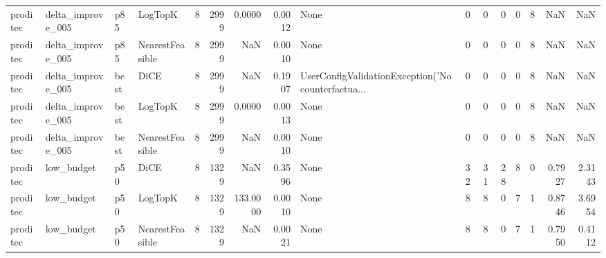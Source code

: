 \begin{tabular}{llllrrrrlrrrrrrr}
proditec &    delta\_improve\_005 &    p85 &         LogTopK &            8 &                 2999 &                   0.0000 &      0.0012 &                                               None &      0 &            0 &        0 &              0 &          8 &                NaN &            NaN \\
proditec &    delta\_improve\_005 &    p85 & NearestFeasible &            8 &                 2999 &                      NaN &      0.0010 &                                               None &      0 &            0 &        0 &              0 &          8 &                NaN &            NaN \\
proditec &    delta\_improve\_005 &   best &            DiCE &            8 &                 2999 &                      NaN &      0.1907 & UserConfigValidationException('No counterfactua... &      0 &            0 &        0 &              0 &          8 &                NaN &            NaN \\
proditec &    delta\_improve\_005 &   best &         LogTopK &            8 &                 2999 &                   0.0000 &      0.0013 &                                               None &      0 &            0 &        0 &              0 &          8 &                NaN &            NaN \\
proditec &    delta\_improve\_005 &   best & NearestFeasible &            8 &                 2999 &                      NaN &      0.0010 &                                               None &      0 &            0 &        0 &              0 &          8 &                NaN &            NaN \\
proditec &           low\_budget &    p50 &            DiCE &            8 &                 1329 &                      NaN &      0.3596 &                                               None &     32 &           31 &       28 &              8 &          0 &             0.7927 &         2.3143 \\
proditec &           low\_budget &    p50 &         LogTopK &            8 &                 1329 &                 133.0000 &      0.0010 &                                               None &      8 &            8 &        0 &              7 &          1 &             0.8746 &         3.6954 \\
proditec &           low\_budget &    p50 & NearestFeasible &            8 &                 1329 &                      NaN &      0.0021 &                                               None &      8 &            8 &        0 &              7 &          1 &             0.7950 &         0.4112 \\

\end{tabular}

